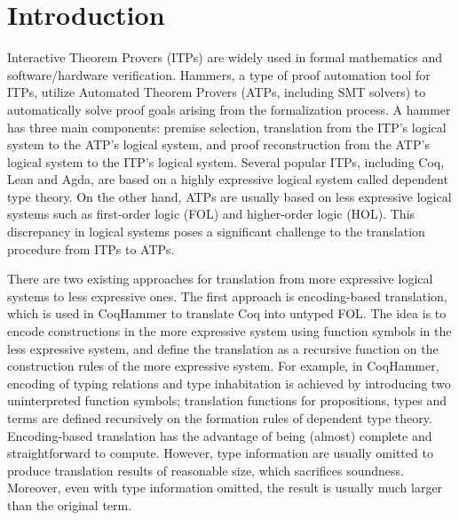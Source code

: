 \section{Introduction}

  Interactive Theorem Provers (ITPs) are widely used in formal mathematics and
  software/hardware verification. Hammers, a type of proof automation tool for
  ITPs, utilize Automated Theorem Provers (ATPs, including SMT solvers) to automatically solve proof goals
  arising from the formalization process. A hammer has three main components:
  premise selection, translation from the ITP's logical system to the ATP's
  logical system, and proof reconstruction from the ATP's logical system to
  the ITP's logical system. Several popular ITPs, including Coq, Lean and Agda,
  are based on a highly expressive logical system called dependent type theory.
  On the other hand, ATPs are usually based on less expressive logical systems such
  as first-order logic (FOL) and higher-order logic (HOL). This discrepancy in
  logical systems poses a significant challenge to the translation procedure from
  ITPs to ATPs.

  \noindent There are two existing approaches for translation from more expressive
  logical systems to less expressive ones. The first approach is encoding-based translation,
  which is used in CoqHammer to translate Coq into untyped FOL. The idea is to encode
  constructions in the more expressive system using function symbols in the less
  expressive system, and define the translation as a recursive function on the construction
  rules of the more expressive system. For example, in CoqHammer, encoding of typing relations
  and type inhabitation is achieved by introducing two uninterpreted function symbols;
  translation functions for propositions, types and terms are defined recursively on
  the formation rules of dependent type theory. Encoding-based translation has the advantage of
  being (almost) complete and straightforward to compute. However, type information are
  usually omitted to produce translation results of reasonable size, which sacrifices soundness.
  Moreover, even with type information omitted, the result is usually much larger
  than the original term.

